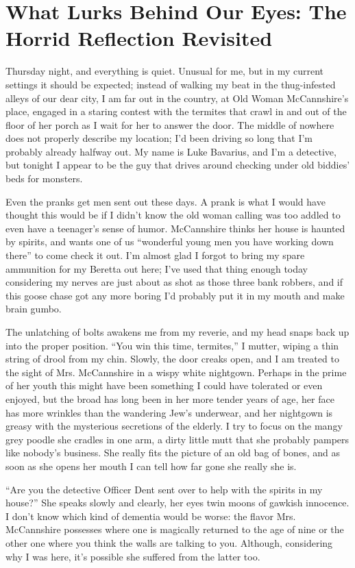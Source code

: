 \chapter[What Lurks Behind Our Eyes]{What Lurks Behind Our Eyes: The Horrid Reflection Revisited}


Thursday night, and everything is quiet. Unusual for me, but in my
current settings it should be expected; instead of walking my beat in
the thug-infested alleys of our dear city, I am far out in the country,
at Old Woman McCannshire's place, engaged in a staring contest with the
termites that crawl in and out of the floor of her porch as I wait for
her to answer the door. The middle of nowhere does not properly describe
my location; I'd been driving so long that I'm probably already halfway
out. My name is Luke Bavarius, and I'm a detective, but tonight I appear
to be the guy that drives around checking under old biddies' beds for
monsters.

Even the pranks get men sent out these days. A prank is what I would
have thought this would be if I didn't know the old woman calling was
too addled to even have a teenager's sense of humor. McCannshire thinks
her house is haunted by spirits, and wants one of us ``wonderful young
men you have working down there'' to come check it out. I'm almost glad I
forgot to bring my spare ammunition for my Beretta out here; I've used
that thing enough today considering my nerves are just about as shot as
those three bank robbers, and if this goose chase got any more boring
I'd probably put it in my mouth and make brain gumbo.

The unlatching of bolts awakens me from my reverie, and my head snaps
back up into the proper position. ``You win this time, termites,'' I
mutter, wiping a thin string of drool from my chin. Slowly, the door
creaks open, and I am treated to the sight of Mrs. McCannshire in a
wispy white nightgown. Perhaps in the prime of her youth this might have
been something I could have tolerated or even enjoyed, but the broad has
long been in her more tender years of age, her face has more wrinkles
than the wandering Jew's underwear, and her nightgown is greasy with the
mysterious secretions of the elderly. I try to focus on the mangy grey
poodle she cradles in one arm, a dirty little mutt that she probably
pampers like nobody's business. She really fits the picture of an old
bag of bones, and as soon as she opens her mouth I can tell how far gone
she really she is.

``Are you the detective Officer Dent sent over to help with the spirits
in my house?'' She speaks slowly and clearly, her eyes twin moons of
gawkish innocence. I don't know which kind of dementia would be worse:
the flavor Mrs. McCannshire possesses where one is magically returned to
the age of nine or the other one where you think the walls are talking
to you. Although, considering why I was here, it's possible she suffered
from the latter too.

